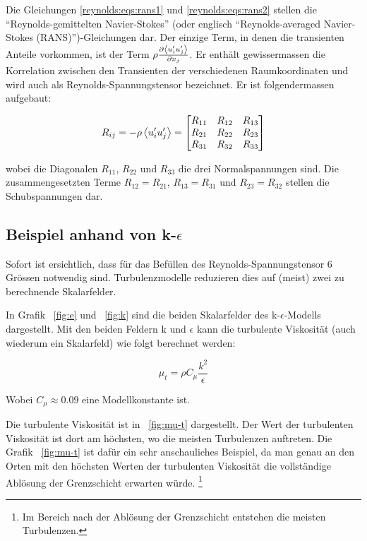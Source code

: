 Die Gleichungen \ref{reynolds:eqs:rans1} und \ref{reynolds:eqs:rans2} stellen die
``Reynolds-gemittelten Navier-Stokes'' (oder englisch ``Reynolds-averaged
Navier-Stokes (RANS)'')-Gleichungen dar. Der einzige Term, in denen die transienten
Anteile vorkommen, ist der Term $\rho \frac{\partial \left\langle u_i' u_j' \right\rangle}{\partial x_j}$.
Er enthält gewissermassen die Korrelation zwischen den Transienten der verschiedenen
Raumkoordinaten und wird auch als Reynolds-Spannungstensor bezeichnet. Er ist folgendermassen
aufgebaut:

\begin{equation}
    R_{ij} = -\rho\left\langle u'_i u'_j \right\rangle =
        \begin{bmatrix}
            R_{11} & R_{12} & R_{13} \\
            R_{21} & R_{22} & R_{23} \\
            R_{31} & R_{32} & R_{33}
        \end{bmatrix}
\end{equation}

wobei die Diagonalen $R_{11}$, $R_{22}$ und $R_{33}$ die drei Normalspannungen sind.
Die zusammengesetzten Terme $R_{12} = R_{21}$, $R_{13} = R_{31}$ und $R_{23} = R_{32}$ stellen
die Schubspannungen dar.

\subsection{Beispiel anhand von k-$\epsilon$}

Sofort ist ersichtlich, dass für das Befüllen des Reynolds-Spannungstensor 6 Grössen notwendig sind.
Turbulenzmodelle reduzieren dies auf (meist) zwei zu berechnende Skalarfelder.


In Grafik ~\ref{fig:e} und ~\ref{fig:k} sind die beiden Skalarfelder des k-$\epsilon$-Modells dargestellt.
Mit den beiden Feldern k und $\epsilon$ kann die turbulente Viskosität (auch wiederum ein Skalarfeld) wie
folgt berechnet werden:

\begin{equation}
    \label{eqs:Turbulent-Viscosity}
    \mu_t = \rho C_\mu \frac{k^2}{\epsilon}
\end{equation}

Wobei $C_\mu \approx 0.09$ eine Modellkonstante ist.

Die turbulente Viskosität ist in ~\ref{fig:mu-t} dargestellt.
Der Wert der turbulenten Viskosität ist dort am höchsten, wo die meisten Turbulenzen auftreten.
Die Grafik ~\ref{fig:mu-t} ist dafür ein sehr anschauliches Beispiel,
da man genau an den Orten mit den höchsten Werten der turbulenten Viskosität die vollständige Ablösung
der Grenzschicht erwarten würde. 
\footnote{Im Bereich nach der Ablösung der Grenzschicht entstehen die meisten Turbulenzen.}

